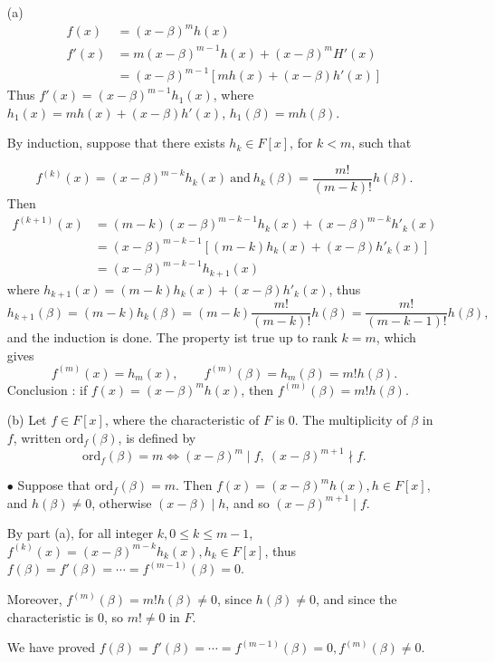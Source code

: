 \documentclass[11pt,a4paper]{article}
\begin{document}
\begin{enumerate}
\item[(a)]
\begin{align*}
f(x) &=(x-\beta)^m h(x)\\
f'(x) &=m(x-\beta)^{m-1} h(x) +(x-\beta)^m H'(x)\\
&=(x-\beta)^{m-1} [mh(x)+(x-\beta) h'(x)]
\end{align*}
Thus $f'(x) = (x-\beta)^{m-1} h_1(x)$, where $h_1(x) = mh(x)+(x-\beta) h'(x)$, $h_1(\beta) = mh(\beta)$.

By induction, suppose that there exists $h_k \in F[x]$, for $k<m$, such that 

$$f^{(k)}(x) = (x-\beta)^{m-k} h_k(x)\ \mathrm{and}\ h_k(\beta) = \frac{m!}{(m-k)!} h(\beta).$$
Then
\begin{align*}
f^{(k+1)}(x) &= (m-k) (x-\beta)^{m-k-1} h_k(x) +(x-\beta)^{m-k}h'_k(x)\\
&=(x-\beta)^{m-k-1}[(m-k) h_k(x) + (x-\beta) h'_k(x)]\\
&= (x-\beta)^{m-k-1} h_{k+1}(x)
\end{align*}
where $h_{k+1}(x) = (m-k) h_k(x) + (x-\beta) h'_k(x)$, thus $$h_{k+1}(\beta) = (m-k)h_k(\beta) = (m-k)  \frac{m!}{(m-k)!} h(\beta) =  \frac{m!}{(m-k-1)!} h(\beta),$$
and the induction is done. The property ist true up to rank $k=m$, which gives
$$f^{(m)}(x) = h_m(x),\qquad f^{(m)}(\beta) = h_m(\beta) = m! h(\beta).$$
Conclusion : if $f(x) =(x-\beta)^m h(x)$, then $f^{(m)}(\beta) = m! h(\beta)$.

\item[(b)] Let $f\in F[x]$, where the characteristic of $F$ is 0. The multiplicity of  $\beta$ in $f$, written  $\mathrm{ord}_f(\beta)$, is defined by
$$\mathrm{ord}_f(\beta) = m \iff (x-\beta)^m \mid f , \ (x-\beta)^{m+1} \nmid f.$$

$\bullet$ Suppose that $\mathrm{ord}_f(\beta)=m$. Then $f(x) = (x-\beta)^m h(x) , h \in F[x]$, and $h(\beta) \neq 0$, otherwise $(x-\beta) \mid h$, and so $(x-\beta)^{m+1} \mid f$.

By part (a), for all integer $k, 0 \leq k \leq m-1$, $f^{(k)}(x) = (x-\beta)^{m-k} h_k(x), h_k \in F[x]$, thus $f(\beta) = f'(\beta) = \cdots = f^{(m-1)}(\beta) = 0$.

Moreover, $f^{(m)}(\beta) = m! h(\beta) \neq 0$, since $h(\beta) \neq 0$, and since the characteristic is 0, so $m!\neq 0$ in $F$.

We have proved $f(\beta) = f'(\beta) = \cdots = f^{(m-1)}(\beta) = 0, f^{(m)}(\beta)\neq 0$.


\end{enumerate}
\end{document}
